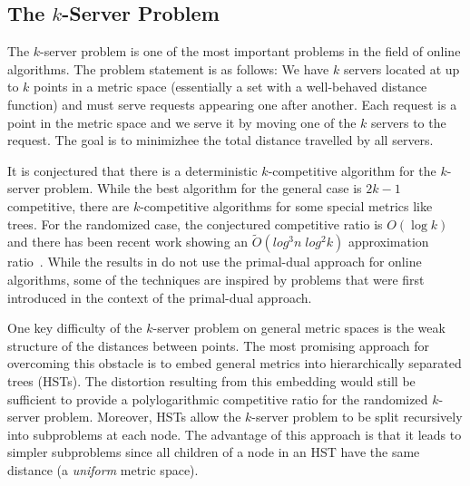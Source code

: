 \subsection{The $k$-Server Problem}
The $k$-server problem is one of the most important problems in the field of online algorithms.
The problem statement is as follows:
We have $k$ servers located at up to $k$ points in a metric space (essentially a set with a well-behaved distance function) and must serve requests appearing one after another.
Each request is a point in the metric space and we serve it by moving one of the $k$ servers to the request.
The goal is to minimizhee the total distance travelled by all servers.

It is conjectured that there is a deterministic $k$-competitive algorithm for the $k$-server problem.
While the best algorithm for the general case is $2k -1$ competitive, there are $k$-competitive algorithms for some special metrics like trees.
For the randomized case, the conjectured competitive ratio is $O(\log k)$ and there has been recent work showing an $\tilde{O}(log^3 n \; log^2 k)$ approximation ratio~\cite{bansal11:randomized-k-server}.
While the results in \cite{bansal11:randomized-k-server} do not use the primal-dual approach for online algorithms, some of the techniques are inspired by problems that were first introduced in the context of the primal-dual approach.

One key difficulty of the $k$-server problem on general metric spaces is the weak structure of the distances between points.
The most promising approach for overcoming this obstacle is to embed general metrics into hierarchically separated trees (HSTs).
The distortion resulting from this embedding would still be sufficient to provide a polylogarithmic competitive ratio for the randomized $k$-server problem.
Moreover, HSTs allow the $k$-server problem to be split recursively into subproblems at each node.
The advantage of this approach is that it leads to simpler subproblems since all children of a node in an HST have the same distance (a \emph{uniform} metric space).

